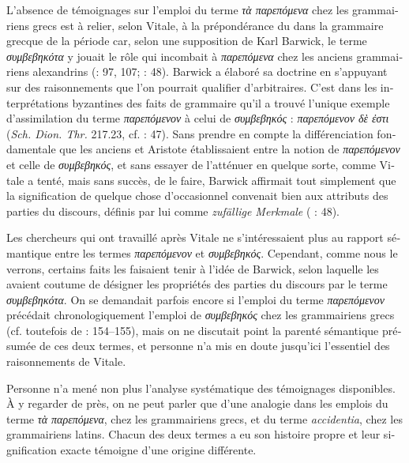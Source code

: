 \documentclass[output=paper]{langsci/langscibook}
\begin{document}
\begin{otherlanguage}{french}
L’absence de témoignages sur l’emploi du terme \textit{τὰ παρεπόμενα} chez les grammairiens grecs est à relier, selon Vitale, à la prépondérance du   dans la grammaire grecque de la période car, selon une supposition de Karl Barwick, le terme \textit{συμβεβηκότα} y jouait le rôle qui incombait à \textit{παρεπόμενα} chez les anciens grammairiens alexandrins (\citealt{barwick_remmius_1922}: 97, 107; \citeyear{barwick_probleme_1957}: 48). Barwick a élaboré sa doctrine en s’appuyant sur des raisonnements que l’on pourrait qualifier d’arbitraires. C’est dans les interprétations byzantines des faits de grammaire qu’il a trouvé l’unique exemple d’assimilation du terme \textit{παρεπόμενον} à celui de \textit{συμβεβηκός} : \textit{παρεπόμενον δὲ ἐστι}  (\textit{Sch. Dion. Thr.} 217.23, cf. \citealt{barwick_probleme_1957} : 47). Sans prendre en compte la différenciation fondamentale que les  anciens et Aristote établissaient entre la notion de \textit{παρεπόμενον} et celle de \textit{συμβεβηκός}, et sans essayer de l’atténuer en quelque sorte, comme Vitale a tenté, mais sans succès, de le faire, Barwick affirmait tout simplement que la signification de quelque chose d’occasionnel convenait bien aux attributs des parties du discours, définis par lui comme \textit{zufällige Merkmale} (\citealt{barwick_probleme_1957} : 48). 

Les chercheurs qui ont travaillé après Vitale ne s’intéressaient plus au rapport sémantique entre les termes \textit{παρεπόμενον} et \textit{συμβεβηκός}. Cependant, comme nous le verrons, certains faits les faisaient tenir à l’idée de Barwick, selon laquelle les  avaient coutume de désigner les propriétés des parties du discours par le terme \textit{συμβεβηκότα}. On se demandait parfois encore si l’emploi du terme \textit{παρεπόμενον} précédait chronologiquement l’emploi de \textit{συμβεβηκός} chez les grammairiens grecs (cf. toutefois de \citealt{jonge_between_2008} : 154–155), mais on ne discutait point la parenté sémantique présumée de ces deux termes, et personne n’a mis en doute jusqu’ici l’essentiel des raisonnements de Vitale. 

Personne n’a mené non plus l’analyse systématique des témoignages disponibles. À y regarder de près, on ne peut parler que d’une analogie dans les emplois du terme \textit{τὰ παρεπόμενα}, chez les grammairiens grecs, et du terme \textit{accidentia}, chez les grammairiens latins. Chacun des deux termes a eu son histoire propre et leur signification exacte témoigne d’une origine différente.


\end{otherlanguage}
\end{document}
